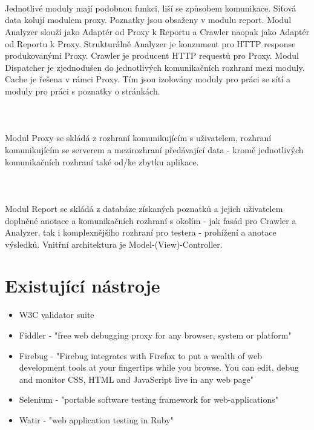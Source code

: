 \documentclass[10pt]{article}
\begin{document}
\paragraph{~}Jednotliv\'e moduly maj\'i podobnou funkci, li\v{s}\'i se zp\r{u}sobem komunikace. S\'i\v{t}ov\'a data koluj\'i modulem proxy. Poznatky jsou obsa\v{z}eny v modulu report. Modul Analyzer slou\v{z}\'i jako Adapt\'er od Proxy k Reportu a Crawler naopak jako Adapt\'er od Reportu k Proxy. Struktur\'aln\v{e} Analyzer je konzument pro HTTP response produkovan\'ymi Proxy. Crawler je producent HTTP request\r{u} pro Proxy. Modul Dispatcher je zjednodu\v{s}en do jednotliv\'ych komunika\v{c}n\'ich rozhran\'i mezi moduly. Cache je \v{r}e\v{s}ena v r\'amci Proxy. T\'im jsou izolov\'any moduly pro pr\'aci se s\'it\'i a moduly pro pr\'aci s poznatky o str\'ank\'ach.
\paragraph{~}Modul Proxy se skl\'ad\'a z rozhran\'i komunikuj\'ic\'im s u\v{z}ivatelem, rozhran\'i komunikuj\'ic\'im se serverem a mezirozhran\'i p\v{r}ed\'avaj\'ic\'i data - krom\v{e} jednotliv\'ych komunika\v{c}n\'ich rozhran\'i tak\'e od/ke zbytku aplikace.
\paragraph{~}Modul Report se skl\'ad\'a z datab\'aze z\'iskan\'ych poznatk\r{u} a jejich u\v{z}ivatelem dopln\v{e}n\'e anotace a komunika\v{c}n\'ich rozhran\'i s okol\'im - jak fas\'ad pro Crawler a Analyzer, tak i komplexn\v{e}j\v{s}\'iho rozhran\'i pro testera - proh\'i\v{z}en\'i a anotace v\'ysledk\r{u}. Vnit\v{r}n\'i architektura je Model-(View)-Controller.
\section{Existuj\'ic\'i n\'astroje}
\begin{itemize}
	\item W3C validator suite
	\item Fiddler - "free web debugging proxy for any browser, system or platform"
	\item Firebug - "Firebug integrates with Firefox to put a wealth of web development tools at your fingertips while you browse. You can edit, debug and monitor CSS, HTML and JavaScript live in any web page"
	\item Selenium - "portable software testing framework for web-applications"
	\item Watir - "web application testing in Ruby"
\end{itemize}	
\end{document}
